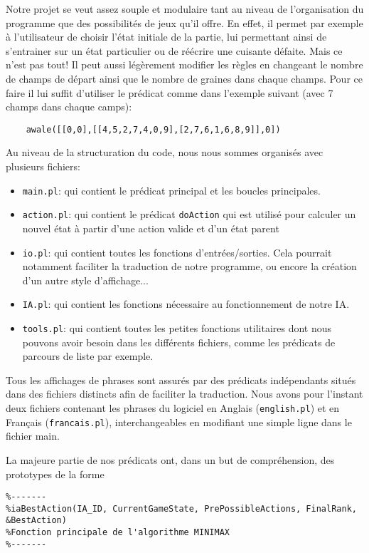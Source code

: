 \documentclass[]{article}
\begin{document}
Notre projet se veut assez souple et modulaire tant au niveau de l'organisation du programme que des possibilités de jeux qu'il offre. En effet, il permet par exemple à l'utilisateur de choisir l'état initiale de la partie, lui permettant ainsi de s'entrainer sur un état particulier ou de réécrire une cuisante défaite.
Mais ce n'est pas tout! Il peut aussi légèrement modifier les règles en changeant le nombre de champs de départ ainsi que le nombre de graines dans chaque champs. Pour ce faire il lui suffit d'utiliser le prédicat comme dans l'exemple suivant (avec 7 champs dans chaque camps):

\begin{verbatim}
	awale([[0,0],[[4,5,2,7,4,0,9],[2,7,6,1,6,8,9]],0])
\end{verbatim}

	
Au niveau de la structuration du code, nous nous sommes organisés avec plusieurs fichiers:
\begin{itemize}
\item \texttt{main.pl}:		qui contient le prédicat principal et les boucles principales.
\item \texttt{action.pl}:		qui contient le prédicat \texttt{doAction} qui est utilisé pour calculer un nouvel état à partir d'une action valide et d'un état parent
\item \texttt{io.pl}:			qui contient toutes les fonctions d'entrées/sorties. Cela pourrait notamment faciliter la traduction de notre programme, ou encore la création d'un autre style d'affichage...
\item \texttt{IA.pl}:			qui contient les fonctions nécessaire au fonctionnement de notre IA.
\item \texttt{tools.pl}:		qui contient toutes les petites fonctions utilitaires dont nous pouvons avoir besoin dans les différents fichiers, comme les prédicats de parcours de liste par exemple.
\end{itemize}

Tous les affichages de phrases sont assurés par des prédicats indépendants situés dans des fichiers distincts afin de faciliter la traduction. Nous avons pour l'instant deux fichiers contenant les phrases du logiciel en Anglais (\texttt{english.pl}) et en Français (\texttt{francais.pl}), interchangeables en modifiant une simple ligne dans le fichier main.
	
La majeure partie de nos prédicats ont, dans un but de compréhension, des prototypes de la forme
\begin{verbatim}
%-------
%iaBestAction(IA_ID, CurrentGameState, PrePossibleActions, FinalRank, &BestAction)
%Fonction principale de l'algorithme MINIMAX
%-------
\end{verbatim}
\end{document}
